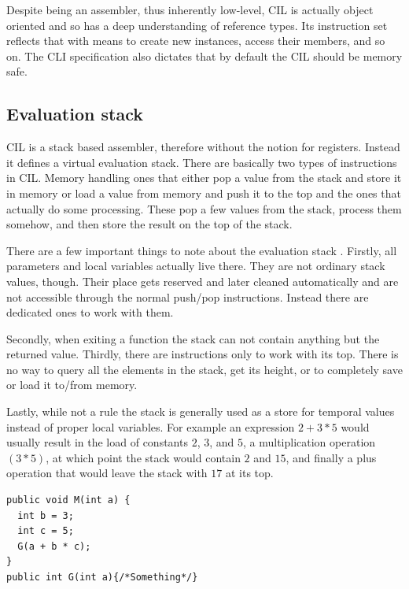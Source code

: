 Despite being an assembler, thus inherently low-level, CIL is actually object oriented and so has a deep understanding of reference types. Its instruction set reflects that with means to create new instances, access their members, and so on. The CLI specification also dictates that by default the CIL should be memory safe. 

\subsection{Evaluation stack}

CIL is a stack based assembler, therefore without the notion for registers. Instead it defines a virtual evaluation stack. There are basically two types of instructions in CIL. Memory handling ones that either pop a value from the stack and store it in memory or load a value from memory and push it to the top and the ones that actually do some processing. These pop a few values from the stack, process them somehow, and then store the result on the top of the stack.

There are a few important things to note about the evaluation stack \citep[Sec. I.12.4]{CLIEcma}. Firstly, all parameters and local variables actually live there. They are not ordinary stack values, though. Their place gets reserved and later cleaned automatically and are not accessible through the normal push/pop instructions. Instead there are dedicated ones to work with them.

Secondly, when exiting a function the stack can not contain anything but the returned value. Thirdly, there are instructions only to work with its top. There is no way to query all the elements in the stack, get its height, or to completely save or load it to/from memory.

Lastly, while not a rule the stack is generally used as a store for temporal values instead of proper local variables. For example an expression $2 + 3 * 5$ would usually result in the load of constants $2$, $3$, and $5$, a multiplication operation $(3 * 5)$, at which point the stack would contain $2$ and $15$, and finally a plus operation that would leave the stack with $17$ at its top.

\begin{verbatim}
public void M(int a) {
  int b = 3;
  int c = 5;    
  G(a + b * c);
}
public int G(int a){/*Something*/}
\end{verbatim}

